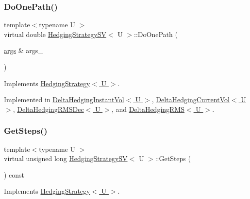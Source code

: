 \subsubsection{\texorpdfstring{Do\+One\+Path()}{DoOnePath()}}
{\footnotesize\ttfamily template$<$typename U $>$ \\
virtual double \hyperlink{classHedgingStrategySV}{Hedging\+Strategy\+SV}$<$ U $>$\+::Do\+One\+Path (\begin{DoxyParamCaption}\item[{\hyperlink{path__generation_8h_a75c13cde2074f502cc4348c70528572d}{args} \&}]{args\+\_\+ }\end{DoxyParamCaption})\hspace{0.3cm}{\ttfamily [pure virtual]}}



Implements \hyperlink{classHedgingStrategy_ad2a7c02ee59750c40f29a03ee6fee140}{Hedging\+Strategy$<$ U $>$}.



Implemented in \hyperlink{classDeltaHedgingInstantVol_ac05386c300db720ed07d8465123a8f7a}{Delta\+Hedging\+Instant\+Vol$<$ U $>$}, \hyperlink{classDeltaHedgingCurrentVol_ad235325f348bd58eb54d9dec389aa2e9}{Delta\+Hedging\+Current\+Vol$<$ U $>$}, \hyperlink{classDeltaHedgingRMSDec_aa9118ce56921178e38a7ed8a6acee656}{Delta\+Hedging\+R\+M\+S\+Dec$<$ U $>$}, and \hyperlink{classDeltaHedgingRMS_ad1dfe5625f1064b9b1f8a45b20f0ee50}{Delta\+Hedging\+R\+M\+S$<$ U $>$}.

\hypertarget{classHedgingStrategySV_a8cdbb26bfa8da99f16161f2449928a5e}{}\label{classHedgingStrategySV_a8cdbb26bfa8da99f16161f2449928a5e} 
\subsubsection{\texorpdfstring{Get\+Steps()}{GetSteps()}}
{\footnotesize\ttfamily template$<$typename U $>$ \\
virtual unsigned long \hyperlink{classHedgingStrategySV}{Hedging\+Strategy\+SV}$<$ U $>$\+::Get\+Steps (\begin{DoxyParamCaption}{ }\end{DoxyParamCaption}) const\hspace{0.3cm}{\ttfamily [virtual]}}



Implements \hyperlink{classHedgingStrategy_a4df1155158f019fb0c4f565045b9e633}{Hedging\+Strategy$<$ U $>$}.



